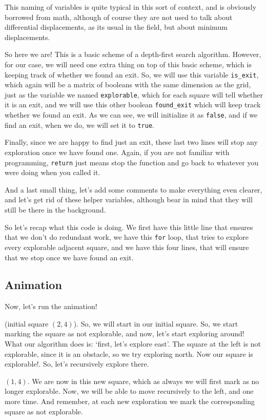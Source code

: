 \documentclass[12pt]{article}
\begin{document}
This naming of variables is quite typical
in this sort of context, and is obviously borrowed from math,
although of course they are not used to talk about differential
displacements, as its usual in the field,
but about minimum displacements.

So here we are! This is a basic scheme of a depth-first
search algorithm. However, for our case, we will need one extra thing
on top of this basic scheme, which is keeping track of whether
we found an exit. So, we will
use this variable \verb|is_exit|, which again will be a matrix
of booleans with the same dimension as the grid, just as the
variable we named \verb|explorable|, which for each square
will tell whether it is an exit, and we will use this other
boolean \verb|found_exit| which will keep track whether we found
an exit. As we can see, we will initialize it as \verb|false|,
and if we find an exit, when we do, we will set it to
\verb|true|.

Finally, since we are happy to find just an exit, these last two
lines will stop any exploration once we have found one.
Again, if you are not familiar with programming,
\verb|return| just means stop the function and go back to whatever
you were doing when you called it.

And a last small thing, let's add some comments to make
everything even clearer, and let's get rid of these
helper variables, although bear in mind that they will
still be there in the background.

So let's recap what this code is doing. We first have this
little line that ensures that we don't do redundant work,
we have this \verb|for| loop, that tries to explore
every explorable adjacent square,
and we have this four lines, that will ensure that we stop
once we have found an exit.

\subsection{Animation}

Now, let's run the animation!

(initial square $(2, 4)$). So, we will start in our
initial square. So, we start marking the square as not
explorable, and now, let's start exploring around!
What our algorithm does is: `first, let's explore east'.
The square at the left is not explorable, since it is an obstacle,
so we try exploring north. Now our square is explorable!. So,
let's recursively explore there.

$(1, 4)$. We are now in this new square,
which as always we will first mark as no longer explorable.
Now, we will be able to move recursively to the left,
and one more time. And remember, at each new exploration we
mark the corresponding square as not explorable.
\end{document}

